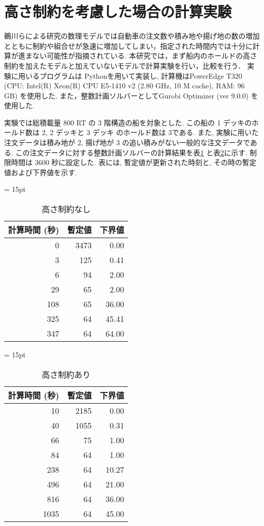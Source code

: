 \documentclass[a4j,11pt,twocolumn]{jsarticle}
\begin{document}
\newpage


\section{高さ制約を考慮した場合の計算実験}
鵜川らによる研究の数理モデルでは自動車の注文数や積み地や揚げ地の数の増加とともに制約や組合せが急速に増加してしまい，指定された時間内では十分に計算が進まない可能性が指摘されている.\cite{ukawa}
本研究では，まず船内のホールドの高さ制約を加えたモデルと加えていないモデルで計算実験を行い，比較を行う．
実験に用いるプログラムは Pythonを用いて実装し, 計算機はPowerEdge T320 (CPU: Intel(R) Xeon(R) CPU E5-1410 v2 (2.80 GHz, 10 M cache), RAM: 96 GB) を使用した. また，整数計画ソルバーとしてGurobi Optimizer (ver 9.0.0) を使用した.

実験では総積載量 800 RT の 3 階構造の船を対象とした. この船の 1 デッキのホールド数は 2, 2 デッキと 3 デッキ のホールド数は 3である. また, 実験に用いた注文データは積み地が 2, 揚げ地が 3 の追い積みがない一般的な注文データである. この注文データに対する整数計画ソルバーの計算結果を表\ref{withoutHeight} と表\ref{Height}に示す. 制限時間は 3600 秒に設定した. 表には, 暫定値が更新された時刻と, その時の暫定値および下界値を示す.

\begin{table}[htbp]
 \centering
 \tabcolsep = 15pt
 \renewcommand{\arraystretch}{0.8}
 \caption{高さ制約なし}
 \label{withoutHeight}
 \begin{tabular}{rrr} \hline
  計算時間 (秒) & 暫定値 & 下界値 \\ \hline
  0 &    3473 & 0.00 \\
  3 & 125 & 0.41 \\
  6 &    94 & 2.00 \\
  29 &    65 & 2.00 \\
  108 &    65 & 36.00 \\
  325 & 64 & 45.41 \\
  347 &    64 & 64.00 \\ \hline
 \end{tabular}
\end{table}

\newpage

\begin{table}[htbp]
 \centering
 \tabcolsep = 15pt
 \renewcommand{\arraystretch}{0.8}
 \caption{高さ制約あり}
 \label{Height}
 \begin{tabular}{rrr} \hline
  計算時間 (秒) & 暫定値 & 下界値 \\ \hline
  10 &    2185 & 0.00 \\
  40 & 1055 & 0.31 \\
  66 &    75 & 1.00 \\
  84 &    64 & 1.00 \\
  238 &    64 & 10.27 \\
  496 &    64 & 21.00 \\
  816 &    64 & 36.00 \\
  1035 & 64 & 45.00 \\ \hline
 \end{tabular}
\end{table}
\end{document}
